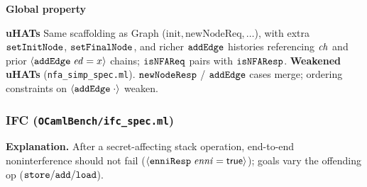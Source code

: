\textbf{Global property}
\vspace{-.35cm}\par{}
\vspace{-.4cm}\par\nobreak\noindent
\textbf{uHATs}
Same scaffolding as Graph (\(\text{init},\text{newNodeReq},\ldots\)), with extra \(\boldsymbol{{\tt setInitNode}}\), \(\boldsymbol{{\tt setFinalNode}}\), and richer \(\boldsymbol{{\tt addEdge}}\) histories referencing \(\mathit{ch}\) and prior \({\langle} {\boldsymbol{{\tt addEdge}}\;{\mathit{ed}=x}} {\rangle}\) chains; \(\boldsymbol{{\tt isNFAReq}}\) pairs with \(\boldsymbol{{\tt isNFAResp}}\)\@.
\textbf{Weakened uHATs} (\texttt{nfa\_simp\_spec.ml}).
\(\boldsymbol{{\tt newNodeResp}}\) / \(\boldsymbol{{\tt addEdge}}\) cases merge; ordering constraints on \({\langle} {\boldsymbol{{\tt addEdge}}\;{\cdot}} {\rangle}\) weaken.

\subsubsection*{IFC (\texttt{OCamlBench/ifc\_spec.ml})}
\textbf{Explanation.}
After a secret-affecting stack operation, end-to-end noninterference should not fail (\({\langle} {\boldsymbol{{\tt enniResp}}\;{\mathit{enni}=\mathsf{true}}} {\rangle}\)); goals vary the offending op (\(\boldsymbol{{\tt store}}/\boldsymbol{{\tt add}}/\boldsymbol{{\tt load}}\)).

